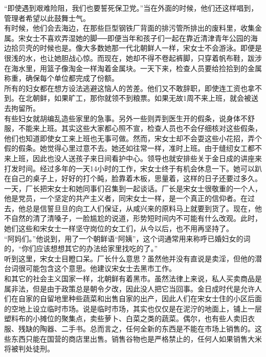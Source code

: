 “即使遇到艰难险阻，我们也要誓死保卫党。”当在外面的时候，他们还这样唱到，管理者希望以此鼓舞士气。\\

有时候，他们会去海边，在那些巨型钢铁厂背面的排污管所排出的废料里，收集金属。宋女士不喜欢弄湿她的脚──即便当年和孩子们一起在靠近清津青年公园的海边拾贝壳的时候也是。像大多数她那一代北朝鲜人一样，宋女士不会游泳。即便是很浅的水，也让她胆战心惊。而现在，她却不得不卷起裤脚，只穿着帆布鞋，跋涉在海水里，用篮子像淘金一样淘着金属块。一天下来，检查人员要给捡拾到的金属称重，确保每个单位都完成了份额。\\

所有的妇女都在想方设法逃避这恼人的苦差。他们又不敢辞职，即使连工资也拿不到。在北朝鲜，如果旷工，那你就领不到粮票。如果无故1周不来上班，就会被送去拘留所。\\

有些妇女就胡编乱造些家里的急事。另外一些则弄到医生开的假条，说身体不舒服，不能来上班。其实这些大家都心照不宣，检查人员也不会仔细核对这些假条，他们也知道即使女工来上班也无事可做。然而，宋女士却不会耍这些小花招，弄个假的假条。她觉得心里过意不去。她还如往常一样，准时上班。由于缝纫女工都不来上班，因此也没人送孩子来日间看护中心。领导也就安排些关于金日成的讲座来打发时间。经过多年的一天14小时的工作，宋女士终于有机会休息一下。她可以趴在自己的桌子上，好好的打个盹，脸靠着木板，思量着，这样的日子还要过多久。\\

一天，厂长把宋女士和她同事们召集到一起谈话。厂长是宋女士很敬重的一个人，他是党员，一个坚定的共产主义者，同宋女士一样，是一个真正的信仰者。在过去，他总是信誓旦旦的向工人们保证，从咸兴来的原料马上就要到货了。现在，他不自然的清了清嗓子，一脸尴尬的说道，形势短时间内不可能有什么改观。此时，她们这些和宋女士一样坚守岗位的女工们，从今以后，也不用再坚持了。\\

“阿妈们。”他说到，用了一个朝鲜语“阿姨”，这个词通常用来称呼已婚妇女的词的，“你们应该想想其它的办法给家里找吃的了。”\\

听到这里，宋女士目瞪口呆。厂长什么意思？虽然他并没有直说是卖淫，但他的潜台词很可能包含这个意思。他建议宋女士去黑市工作。\\

和其它的社会主义国家一样，北朝鲜有着黑市。虽然法律上来说，私人买卖商品是属非法，但是由于政策总是朝令夕改，因此没人把它当回事。金日成时代是允许人们在自家的自留地里种些蔬菜和出售自家的出产，因此人们在宋女士住的小区后面的空地上设立临时市场。说是临时市场，其实也仅仅是在泥泞的地面上，铺上一层塑料布的小摊位的聚集点，卖些萝卜、白菜之类的蔬菜。偶尔，也有些人卖旧衣服、残缺的陶器、二手书。总而言之，任何全新的东西是不能在市场上销售的。这些东西只能在国营的商店里出售。销售谷物也是严格禁止的，任何人如果销售大米将被判处徒刑。\\

